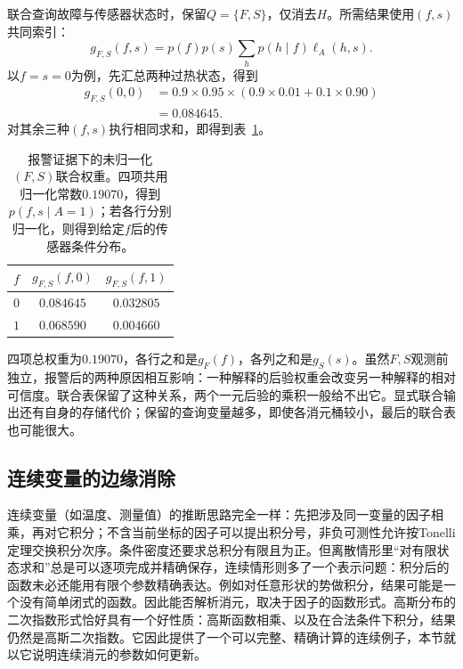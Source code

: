 联合查询故障与传感器状态时，保留$Q=\{F,S\}$，仅消去$H$。所需结果使用$(f,s)$共同索引：
\begin{equation}
  g_{F,S}(f,s)
  =p(f)p(s)\sum_h p(h\mid f)\ell_A(h,s).
  \label{eq:pgm-elimination-joint-query}
\end{equation}
以$f=s=0$为例，先汇总两种过热状态，得到
\[
  \begin{aligned}
    g_{F,S}(0,0)
    &=0.9\times0.95\times(0.9\times0.01+0.1\times0.90)\\
    &=0.084645.
  \end{aligned}
\]
对其余三种$(f,s)$执行相同求和，即得到表~\ref{tab:pgm-elimination-joint-query}。

\begin{table}[htbp]
  \centering
  \begin{tabular}{ccc}
    \toprule
    $f$ & $g_{F,S}(f,0)$ & $g_{F,S}(f,1)$\\
    \midrule
    $0$ & $0.084645$ & $0.032805$\\
    $1$ & $0.068590$ & $0.004660$\\
    \bottomrule
  \end{tabular}
  \caption{报警证据下的未归一化$(F,S)$联合权重。四项共用归一化常数$0.19070$，得到$p(f,s\mid A=1)$；若各行分别归一化，则得到给定$f$后的传感器条件分布。}
  \label{tab:pgm-elimination-joint-query}
\end{table}

四项总权重为$0.19070$，各行之和是$g_F(f)$，各列之和是$g_S(s)$。虽然$F,S$观测前独立，报警后的两种原因相互影响：一种解释的后验权重会改变另一种解释的相对可信度。联合表保留了这种关系，两个一元后验的乘积一般给不出它。显式联合输出还有自身的存储代价；保留的查询变量越多，即使各消元桶较小，最后的联合表也可能很大。

\subsection{连续变量的边缘消除}
\label{sec:pgm-elimination-gaussian}

连续变量（如温度、测量值）的推断思路完全一样：先把涉及同一变量的因子相乘，再对它积分；不含当前坐标的因子可以提出积分号，非负可测性允许按Tonelli定理交换积分次序。条件密度还要求总积分有限且为正。但离散情形里“对有限状态求和”总是可以逐项完成并精确保存，连续情形则多了一个表示问题：积分后的函数未必还能用有限个参数精确表达。例如对任意形状的势做积分，结果可能是一个没有简单闭式的函数。因此能否解析消元，取决于因子的函数形式。高斯分布的二次指数形式恰好具有一个好性质：高斯函数相乘、以及在合法条件下积分，结果仍然是高斯二次指数。它因此提供了一个可以完整、精确计算的连续例子，本节就以它说明连续消元的参数如何更新。

